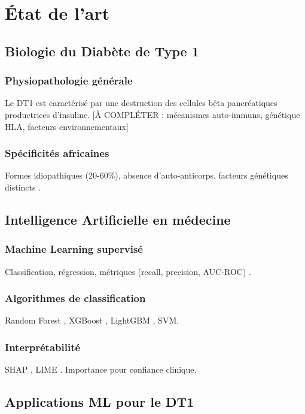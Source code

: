 \chapter{État de l'art}
\label{chap:etat_art}

\section{Biologie du Diabète de Type 1}

\subsection{Physiopathologie générale}
Le DT1 est caractérisé par une destruction des cellules bêta pancréatiques productrices d'insuline. [À COMPLÉTER : mécanismes auto-immuns, génétique HLA, facteurs environnementaux]

\subsection{Spécificités africaines}
Formes idiopathiques (20-60\%), absence d'auto-anticorps, facteurs génétiques distincts \cite{Katte2023,Sobngwi2002}.

\section{Intelligence Artificielle en médecine}

\subsection{Machine Learning supervisé}
Classification, régression, métriques (recall, precision, AUC-ROC) \cite{Bishop2006,Hastie2009}.

\subsection{Algorithmes de classification}
Random Forest \cite{Breiman2001}, XGBoost \cite{Chen2016}, LightGBM \cite{Ke2017}, SVM.

\subsection{Interprétabilité}
SHAP \cite{Lundberg2017}, LIME \cite{Ribeiro2016}. Importance pour confiance clinique.

\section{Applications ML pour le DT1}

